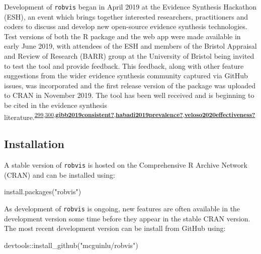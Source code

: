 \documentclass[a4paper, twoside]{templates/ociamthesis}
\newenvironment{Shaded}{\begin{snugshade}}{\end{snugshade}}
\newcommand{\FunctionTok}[1]{\textcolor[rgb]{0.00,0.00,0.00}{#1}}
\newcommand{\NormalTok}[1]{#1}
\newcommand{\SpecialCharTok}[1]{\textcolor[rgb]{0.00,0.00,0.00}{#1}}
\newcommand{\StringTok}[1]{\textcolor[rgb]{0.31,0.60,0.02}{#1}}
\renewenvironment{Shaded}
{
  \vspace{4pt}%
  \begin{snugshade}%
}{%
  \end{snugshade}%
  \vspace{4pt}%
}
\begin{document}
Development of \texttt{robvis} began in April 2019 at the Evidence Synthesis Hackathon (ESH), an event which brings together interested researchers, practitioners and coders to discuss and develop new open-source evidence synthesis technologies. Test versions of both the R package and the web app were made available in early June 2019, with attendees of the ESH and members of the Bristol Appraisal and Review of Research (BARR) group at the University of Bristol being invited to test the tool and provide feedback. This feedback, along with other feature suggestions from the wider evidence synthesis community captured via GitHub issues, was incorporated and the first release version of the package was uploaded to CRAN in November 2019. The tool has been well received and is beginning to be cited in the evidence synthesis literature.\textsuperscript{\protect\hyperlink{ref-simillis2020}{299},\protect\hyperlink{ref-tanneru2020}{300},\protect\hyperlink{ref-gibb2019consistent}{\textbf{gibb2019consistent?}},\protect\hyperlink{ref-habadi2019prevalence}{\textbf{habadi2019prevalence?}},\protect\hyperlink{ref-veloso2020effectiveness}{\textbf{veloso2020effectiveness?}}}

\hypertarget{installation-1}{%
\subsection{Installation}\label{installation-1}}

A stable version of \texttt{robvis} is hosted on the Comprehensive R Archive Network (CRAN) and can be installed using:

\begin{Shaded}
\begin{Highlighting}[]
\FunctionTok{install.packages}\NormalTok{(}\StringTok{"robvis"}\NormalTok{)}
\end{Highlighting}
\end{Shaded}

As development of \texttt{robvis} is ongoing, new features are often available in the development version some time before they appear in the stable CRAN version. The most recent development version can be install from GitHub using:

\begin{Shaded}
\begin{Highlighting}[]
\NormalTok{devtools}\SpecialCharTok{::}\FunctionTok{install\_github}\NormalTok{(}\StringTok{"mcguinlu/robvis"}\NormalTok{)}
\end{Highlighting}
\end{Shaded}
\end{document}
